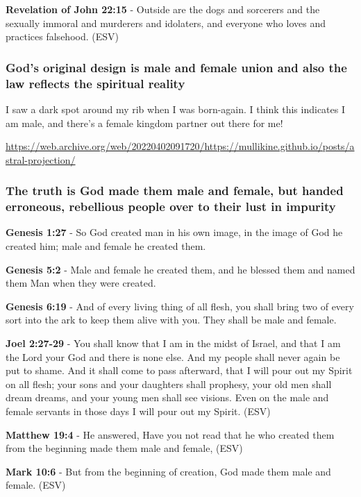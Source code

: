 \documentclass[11pt]{article}
\begin{document}
\textbf{Revelation of John 22:15} - Outside are the dogs and sorcerers and the sexually immoral and murderers and idolaters, and everyone who loves and practices falsehood. (ESV)

\subsubsection{God's original design is male and female union and also the law reflects the spiritual reality}
\label{sec:orgf79fc32}

I saw a dark spot around my rib when I was born-again.
I think this indicates I am male, and there's a female kingdom partner out there for me!

\url{https://web.archive.org/web/20220402091720/https://mullikine.github.io/posts/astral-projection/}

\subsubsection{The truth is God made them male and female, but handed erroneous, rebellious people over to their lust in impurity}
\label{sec:org11bc166}
\textbf{Genesis 1:27} - So God created man in his own image, in the image of God he created him; male and female he created them.

\textbf{Genesis 5:2} - Male and female he created them, and he blessed them and named them Man when they were created.

\textbf{Genesis 6:19} - And of every living thing of all flesh, you shall bring two of every sort into the ark to keep them alive with you. They shall be male and female.

\textbf{Joel 2:27-29} - You shall know that I am in the midst of Israel, and that I am the Lord your God and there is none else. And my people shall never again be put to shame. And it shall come to pass afterward, that I will pour out my Spirit on all flesh; your sons and your daughters shall prophesy, your old men shall dream dreams, and your young men shall see visions. Even on the male and female servants in those days I will pour out my Spirit. (ESV)

\textbf{Matthew 19:4} - He answered, Have you not read that he who created them from the beginning made them male and female, (ESV)

\textbf{Mark 10:6} - But from the beginning of creation, God made them male and female. (ESV)
\end{document}

